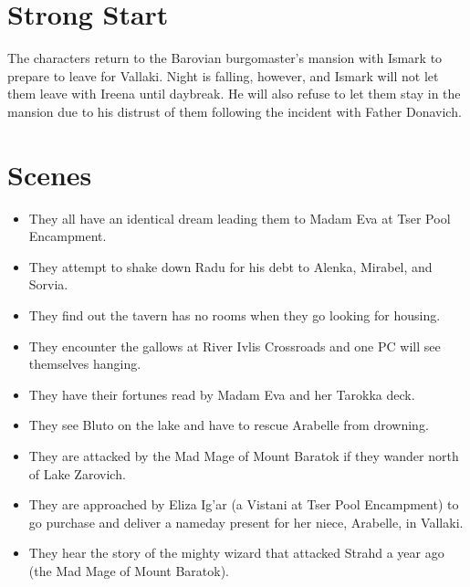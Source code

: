 \documentclass[a4paper,11pt]{article}
\begin{document}
\pagebreak
\section{Strong Start}
\label{sec:StrongStart}
The characters return to the Barovian burgomaster's mansion with Ismark to prepare to leave for Vallaki.
Night is falling, however, and Ismark will not let them leave with Ireena until daybreak. He will also refuse
to let them stay in the mansion due to his distrust of them following the incident with Father Donavich.

\section{Scenes}
\label{sec:Scenes}
\begin{itemize}
  \item They all have an identical dream leading them to Madam Eva at Tser Pool Encampment.
  \item They attempt to shake down Radu for his debt to Alenka, Mirabel, and Sorvia.
  \item They find out the tavern has no rooms when they go looking for housing.
  \item They encounter the gallows at River Ivlis Crossroads and one PC will see themselves hanging.
  \item They have their fortunes read by Madam Eva and her Tarokka deck.
  \item They see Bluto on the lake and have to rescue Arabelle from drowning.
  \item They are attacked by the Mad Mage of Mount Baratok if they wander north of Lake Zarovich.
  \item They are approached by Eliza Ig'ar (a Vistani at Tser Pool Encampment) to go purchase and deliver a 
  nameday present for her niece, Arabelle, in Vallaki.
  \item They hear the story of the mighty wizard that attacked Strahd a year ago (the Mad Mage of Mount Baratok).
\end{itemize}
\end{document}
